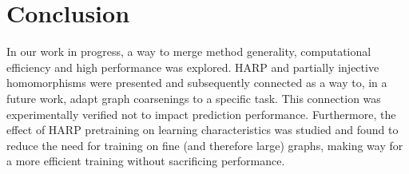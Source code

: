 \section{Conclusion}

In our work in progress, a way to merge method generality, computational efficiency and high performance was explored. HARP and partially injective homomorphisms were presented and subsequently connected as a way to, in a future work, adapt graph coarsenings to a specific task. This connection was experimentally verified not to impact prediction performance. Furthermore, the effect of HARP pretraining on learning characteristics was studied and found to reduce the need for training on fine (and therefore large) graphs, making way for a more efficient training without sacrificing performance.
